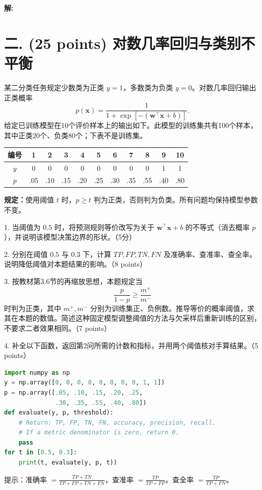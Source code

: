 \documentclass[8pt]{article}
\begin{document}
\textbf{\large 解:}

\newpage
\section*{二. (25 points) 对数几率回归与类别不平衡}
某二分类任务规定少数类为正类 $y=1$，多数类为负类 $y=0$。对数几率回归输出正类概率
\[
p(\mathbf{x})=\frac{1}{1+\exp[-(\textbf{w}^{\top}\mathbf{x}+b)]}.
\]
给定已训练模型在10个评价样本上的输出如下。此模型的训练集共有100个样本，其中正类20个、负类80个；下表不是训练集。
\begin{center}
\begin{tabular}{c*{10}{c}}
\toprule
编号 & 1 & 2 & 3 & 4 & 5 & 6 & 7 & 8 & 9 & 10 \\
\midrule
$y$ & 0 & 0 & 0 & 0 & 0 & 0 & 0 & 0 & 1 & 1 \\
$p$ & .05 & .10 & .15 & .20 & .25 & .30 & .35 & .55 & .40 & .80 \\
\bottomrule
\end{tabular}
\end{center}
\textbf{规定：}使用阈值 $t$ 时，$p\geq t$ 判为正类，否则判为负类。所有问题均保持模型参数不变。

1. 当阈值为 $0.5$ 时，将预测规则等价改写为关于 $\mathbf{w}^{\top}\mathbf{x}+b$ 的不等式（消去概率 $p$），并说明该模型决策边界的形状。（5分）


2. 分别在阈值 $0.5$ 与 $0.3$ 下，计算 $TP,FP,TN,FN$ 及准确率、查准率、查全率。说明降低阈值对本题结果的影响。（8 points）

3. 按教材第3.6节的再缩放思想，本题规定当
\[
\frac{p}{1-p}\geq\frac{m^+}{m^-}
\]
时判为正类，其中 $m^+,m^-$ 分别为训练集正、负例数。推导等价的概率阈值，求其在本题的数值。简述这种固定模型调整阈值的方法与欠采样后重新训练的区别，不要求二者效果相同。（7 points）

4. 补全以下函数，返回第2问所需的计数和指标，并用两个阈值核对手算结果。（5 points）
\begin{lstlisting}[language=Python,caption=分类评价代码框架]
import numpy as np
y = np.array([0, 0, 0, 0, 0, 0, 0, 0, 1, 1])
p = np.array([.05, .10, .15, .20, .25,
              .30, .35, .55, .40, .80])
def evaluate(y, p, threshold):
    # Return: TP, FP, TN, FN, accuracy, precision, recall.
    # If a metric denominator is zero, return 0.
    pass
for t in [0.5, 0.3]:
    print(t, evaluate(y, p, t))
\end{lstlisting}
\noindent 提示：准确率 $=\frac{TP+TN}{TP+FP+TN+FN}$，查准率 $=\frac{TP}{TP+FP}$，查全率 $=\frac{TP}{TP+FN}$。
\end{document}

